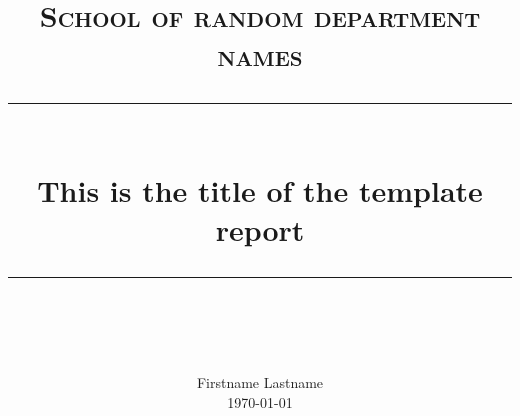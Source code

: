 \documentclass{scrartcl}
\begin{document}


\newcommand{\horrule}[1]{\rule{\linewidth}{#1}} 	%

\title{
		\normalfont \normalsize \textsc{School of random department names} \\ [25pt]
		\horrule{0.5pt} \\[0.4cm]
		\huge This is the title of the template report \\
		\horrule{2pt} \\[0.5cm]
}
\author{
		\normalfont 								\normalsize
        Firstname Lastname\\[-3pt]		\normalsize
        \today
}
\date{}
\end{document}
